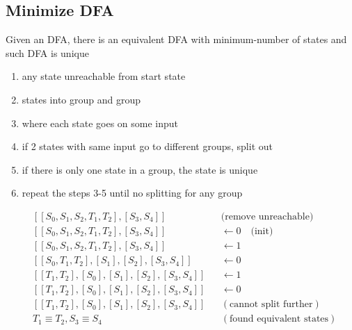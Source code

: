 \documentclass[10pt,a4paper,landscape]{article}
\begin{document}
\begin{multicols*}{3}
\begin{minipage}{0.5\linewidth}
\end{minipage}
\section*{Minimize DFA}
Given an DFA, there is an equivalent DFA with minimum-number of states and such DFA is unique
\begin{enumerate}
\item {} any state unreachable from start state
\item {} states into  group and  group
\item {} where each state goes on some input
\item if 2 states with same input go to different groups, split out
\item if there is only one state in a group, the state is unique
\item repeat the steps 3-5 until no splitting for any group
\end{enumerate}
\vspace{-1em}
\begin{minipage}{0.45\linewidth}
  \begin{align*}
    & [[S_{0},S_{1},S_{2},T_{1},T_{2}],[S_{3},S_{4}]] && \text{(remove unreachable)}\\
    & [[S_{0},S_{1},S_{2},T_{1},T_{2}],[S_{3},S_{4}]] && \leftarrow 0\quad \text{(init)}\\
    & [[S_{0},S_{1},S_{2},T_{1},T_{2}],[S_{3},S_{4}]] && \leftarrow 1\\
    & [[S_{0},T_{1},T_{2}],[S_{1}],[S_{2}],[S_{3},S_{4}]] && \leftarrow 0\\
    & [[T_{1},T_{2}],[S_{0}],[S_{1}],[S_{2}],[S_{3},S_{4}]] &&  \leftarrow 1\\
    & [[T_{1},T_{2}],[S_{0}],[S_{1}],[S_{2}],[S_{3},S_{4}]] &&  \leftarrow 0\\
    & [[T_{1},T_{2}],[S_{0}],[S_{1}],[S_{2}],[S_{3},S_{4}]] && (\text{cannot split further}) \\
    & T_{1} \equiv T_{2}, S_{3} \equiv S_{4} && (\text{found equivalent states})
  \end{align*}

\end{minipage}
\end{multicols*}
\end{document}

